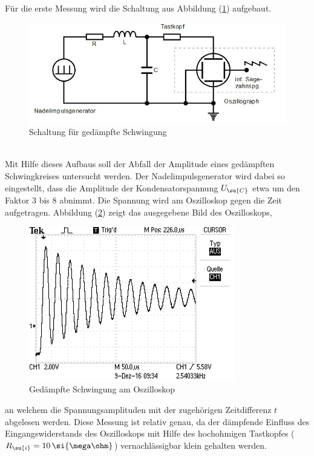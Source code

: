 Für die erste Messung wird die Schaltung aus Abbildung (\ref{fig:schlt1})
aufgebaut.
\begin{figure}[h]
  \centering
  \includegraphics[width=\textwidth]{Bilder/dmpfschalt.JPG}
  \caption{Schaltung für gedämpfte Schwingung}
  \label{fig:schlt1}
\end{figure} \\
Mit Hilfe dieses Aufbaus soll der Abfall der Amplitude eines gedämpften
Schwingkreises untersucht werden. Der Nadelimpulsgenerator wird dabei so
eingestellt, dass die Amplitude der Kondensatorspannung $U_\su{C}$ etwa um
den Faktor 3 bis 8 abnimmt. Die Spannung wird am Oszilloskop gegen die Zeit
aufgetragen.
Abbildung (\ref{fig:dämpfung}) zeigt das ausgegebene Bild des Oszilloskops,
\begin{figure} %
  \centering
  \includegraphics[width=0.8\textwidth]{Bilder/Dmpfung.JPG}
  \caption{Gedämpfte Schwingung am Oszilloskop}
  \label{fig:dämpfung}
\end{figure}
an welchem die Spannungsamplituden mit der zugehörigen Zeitdifferenz $t$
abgelesen werden. Diese Messung ist relativ genau, da der dämpfende Einfluss
des Eingangswiderstands des Oszilloskops mit Hilfe des hochohmigen Tastkopfes
($R_\su{i}=10\,\si{\mega\ohm}$) vernachlässigbar klein gehalten werden.
